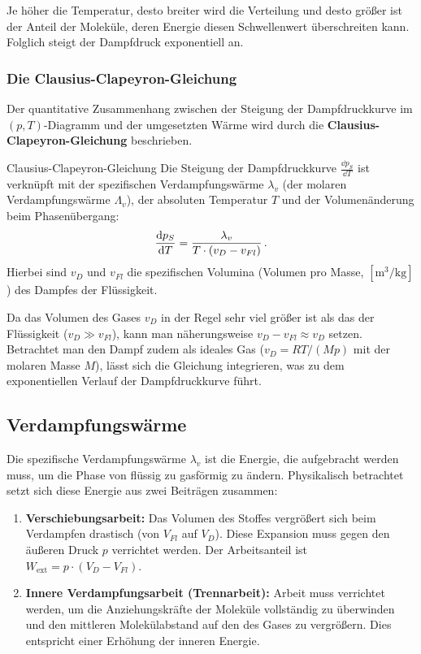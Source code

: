 Je höher die Temperatur, desto breiter wird die Verteilung und desto größer ist der Anteil der Moleküle, deren Energie diesen Schwellenwert überschreiten kann. Folglich steigt der Dampfdruck exponentiell an.

\subsubsection{Die Clausius-Clapeyron-Gleichung}
Der quantitative Zusammenhang zwischen der Steigung der Dampfdruckkurve im $(p,T)$-Diagramm und der umgesetzten Wärme wird durch die \textbf{Clausius-Clapeyron-Gleichung} beschrieben.
\begin{importantbox}{Clausius-Clapeyron-Gleichung}
    Die Steigung der Dampfdruckkurve $\frac{\dd p_S}{\dd T}$ ist verknüpft mit der spezifischen Verdampfungswärme $\lambda_v$ (\bzw der molaren Verdampfungswärme $\Lambda_v$), der absoluten Temperatur $T$ und der Volumenänderung beim Phasenübergang:
    \begin{equation}\label{eq: clausius_clapeyron}
        \frac{\mathrm{d} p_S}{\mathrm{d} T} = \frac{\lambda_v}{T \cdot (v_D - v_{Fl})} \,.
    \end{equation}
    Hierbei sind $v_D$ und $v_{Fl}$ die spezifischen Volumina (Volumen pro Masse, $[\si{\cubic\meter\per\kilogram}]$) des Dampfes \bzw der Flüssigkeit.
\end{importantbox}

Da das Volumen des Gases $v_D$ in der Regel sehr viel größer ist als das der Flüssigkeit ($v_D \gg v_{Fl}$), kann man näherungsweise $v_D - v_{Fl} \approx v_D$ setzen. Betrachtet man den Dampf zudem als ideales Gas ($v_D = RT/(M p)$ mit der molaren Masse $M$), lässt sich die Gleichung integrieren, was zu dem exponentiellen Verlauf der Dampfdruckkurve führt.

\subsection{Verdampfungswärme}\label{subsec: ursachen_verdampfungswaerme}
Die spezifische Verdampfungswärme $\lambda_v$ ist die Energie, die aufgebracht werden muss, um die Phase von flüssig zu gasförmig zu ändern. Physikalisch betrachtet setzt sich diese Energie aus zwei Beiträgen zusammen:
\begin{enumerate}
    \item \textbf{Verschiebungsarbeit:} Das Volumen des Stoffes vergrößert sich beim Verdampfen drastisch (von $V_{Fl}$ auf $V_D$). Diese Expansion muss gegen den äußeren Druck $p$ verrichtet werden. Der Arbeitsanteil ist $W_{\text{ext}} = p \cdot (V_D - V_{Fl})$.
    \item \textbf{Innere Verdampfungsarbeit (Trennarbeit):} Arbeit muss verrichtet werden, um die Anziehungskräfte der Moleküle vollständig zu überwinden und den mittleren Molekülabstand auf den des Gases zu vergrößern. Dies entspricht einer Erhöhung der inneren Energie.
\end{enumerate}

